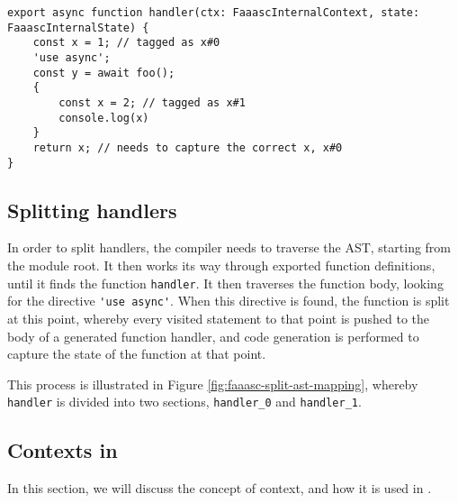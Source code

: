\begin{listing}[H]
\begin{verbatim}
export async function handler(ctx: FaaascInternalContext, state: FaaascInternalState) {
    const x = 1; // tagged as x#0
    'use async';
    const y = await foo();
    {
        const x = 2; // tagged as x#1
        console.log(x)
    }
    return x; // needs to capture the correct x, x#0
}
\end{verbatim}
\caption{Example of scope variables that need to be captured in a continuation.}
\label{listing:scope-syntax-context}
\end{listing}

\subsection{Splitting \faas{} handlers}
In order to split handlers, the \faaasc{} compiler needs to traverse the AST, starting from the module root. It then works its way through exported function definitions, until it finds the function \verb|handler|. It then traverses the function body, looking for the directive \verb|'use async'|. When this directive is found, the function is split at this point, whereby every visited statement to that point is pushed to the body of a generated function handler, and code generation is performed to capture the state of the function at that point.

This process is illustrated in Figure \ref{fig:faaasc-split-ast-mapping}, whereby \verb|handler| is divided into two sections, \verb|handler_0| and \verb|handler_1|.

\begin{figure*}
    \fontsize{8}{10}\selectfont
    \centering
    
    \caption{Illustration of how an input AST is split into multiple handlers using \texttt{faaasc}. Colours are used to represent which sections of the source AST are output into which sections of the output AST.}
    \label{fig:faaasc-split-ast-mapping}
\end{figure*}

\subsection{Contexts in \faaasc{}}
In this section, we will discuss the concept of context, and how it is used in \faaasc{}.

